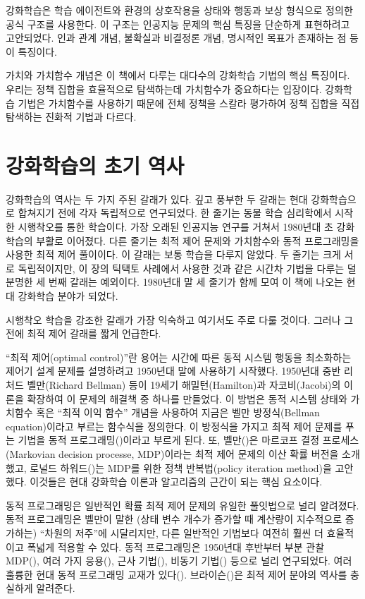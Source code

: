 강화학습은 학습 에이전트와 환경의 상호작용을 상태와 행동과 보상 형식으로 정의한
공식 구조를 사용한다. 이 구조는 인공지능 문제의 핵심 특징을 단순하게 표현하려고
고안되었다. 인과 관계 개념, 불확실과 비결정론 개념, 명시적인 목표가 존재하는 점
등이 특징이다.

가치와 가치함수 개념은 이 책에서 다루는 대다수의 강화학습 기법의 핵심 특징이다.
우리는 정책 집합을 효율적으로 탐색하는데 가치함수가 중요하다는 입장이다.
강화학습 기법은 가치함수를 사용하기 때문에 전체 정책을 스칼라 평가하여 정책
집합을 직접 탐색하는 진화적 기법과 다르다.

\section{강화학습의 초기 역사}

강화학습의 역사는 두 가지 주된 갈래가 있다. 깊고 풍부한 두 갈래는 현대
강화학습으로 합쳐지기 전에 각자 독립적으로 연구되었다. 한 줄기는 동물 학습
심리학에서 시작한 시행착오를 통한 학습이다. 가장 오래된 인공지능 연구를 거쳐서
1980년대 초 강화학습의 부활로 이어졌다. 다른 줄기는 최적 제어 문제와 가치함수와
동적 프로그래밍을 사용한 최적 제어 풀이이다. 이 갈래는 보통 학습을 다루지
않았다. 두 줄기는 크게 서로 독립적이지만, 이 장의 틱택토 사례에서 사용한 것과
같은 시간차 기법을 다루는 덜 분명한 세 번째 갈래는 예외이다. 1980년대 말 세
줄기가 함께 모여 이 책에 나오는 현대 강화학습 분야가 되었다.

시행착오 학습을 강조한 갈래가 가장 익숙하고 여기서도 주로 다룰 것이다. 그러나 그
전에 최적 제어 갈래를 짧게 언급한다.

``최적 제어(optimal control)''란 용어는 시간에 따른 동적 시스템 행동을
최소화하는 제어기 설계 문제를 설명하려고 1950년대 말에 사용하기 시작했다.
1950년대 중반 리처드 벨만(Richard Bellman) 등이 19세기 해밀턴(Hamilton)과
자코비(Jacobi)의 이론을 확장하여 이 문제의 해결책 중 하나를 만들었다. 이 방법은
동적 시스템 상태와 가치함수 혹은 ``최적 이익 함수'' 개념을 사용하여 지금은 벨만
방정식(Bellman equation)이라고 부르는 함수식을 정의한다. 이 방정식을 가지고 최적
제어 문제를 푸는 기법을 동적 프로그래밍(\cite{Bellman1957a})이라고 부르게 된다.
또, 벨만(\cite*{Bellman1957b})은 마르코프 결정 프로세스(Markovian decision
processe, MDP)이라는 최적 제어 문제의 이산 확률 버전을 소개했고, 로널드
하워드(\cite{Howard1960})는 MDP를 위한 정책 반복법(policy iteration method)을
고안했다. 이것들은 현대 강화학습 이론과 알고리즘의 근간이 되는 핵심 요소이다.


동적 프로그래밍은 일반적인 확률 최적 제어 문제의 유일한 풀잇법으로 널리
알려졌다. 동적 프로그래밍은 벨만이 말한 (상태 변수 개수가 증가할 때 계산량이
지수적으로 증가하는) ``차원의 저주''에 시달리지만, 다른 일반적인 기법보다 여전히
훨씬 더 효율적이고 폭넓게 적용할 수 있다. 동적 프로그래밍은 1950년대 후반부터
부분 관찰 MDP(\cite{Lovejoy1991}), 여러 가지 응용(\cite{White1985, White1988,
White1993}), 근사 기법(\cite{Rust1996}), 비동기 기법(\cite{Bertsekas1982,
Bertsekas1983}) 등으로 널리 연구되었다. 여러 훌륭한 현대 동적 프로그래밍 교재가
있다(\cite[예,][]{Bertsekas2005, Bertsekas2012, Puterman1994, Ross1983,
Whittle1982, Whittle1983}). 브라이슨(\cite{Bryson1996})은 최적 제어 분야의
역사를 충실하게 알려준다.

